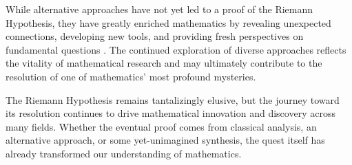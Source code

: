 \begin{conclusion}
While alternative approaches have not yet led to a proof of the Riemann Hypothesis, they have greatly enriched mathematics by revealing unexpected connections, developing new tools, and providing fresh perspectives on fundamental questions \cite{connes1999,berrykeating1999}. The continued exploration of diverse approaches reflects the vitality of mathematical research and may ultimately contribute to the resolution of one of mathematics' most profound mysteries.

The Riemann Hypothesis remains tantalizingly elusive, but the journey toward its resolution continues to drive mathematical innovation and discovery across many fields. Whether the eventual proof comes from classical analysis, an alternative approach, or some yet-unimagined synthesis, the quest itself has already transformed our understanding of mathematics.
\end{conclusion}
